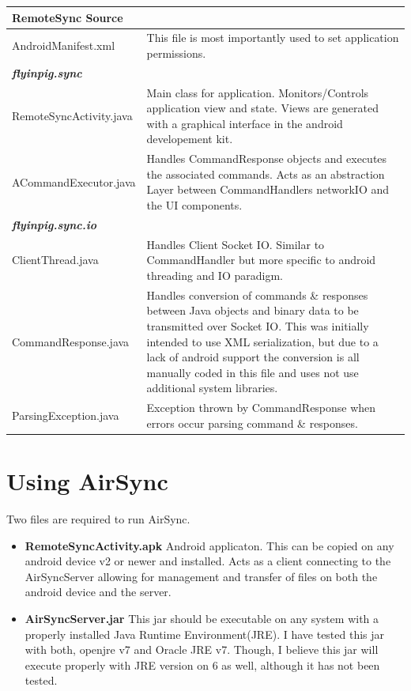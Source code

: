 \documentclass[12pt]{article}
\begin{document}
\begin{center}
\begin{tabular}{|l|p{7.5cm}|}
\hline
	\textbf{RemoteSync Source} \\
\hline 
	AndroidManifest.xml
	& This file is most importantly used to set application permissions.\\
\hline
	\emph{\textbf{flyinpig.sync}}\\
\hline
	RemoteSyncActivity.java
	& Main class for application. Monitors/Controls application view and state. Views are generated with a graphical interface in the android developement kit.\\
\hline
	ACommandExecutor.java
	& Handles CommandResponse objects and executes the associated commands. Acts as an abstraction Layer between CommandHandlers networkIO and the UI components. \\
\hline
	\emph{\textbf{flyinpig.sync.io}}\\
\hline
	ClientThread.java
	& Handles Client Socket IO. Similar to CommandHandler but more specific to android threading and IO paradigm.\\
\hline
	CommandResponse.java
	& Handles conversion of commands \& responses between Java objects and binary data to be transmitted over Socket IO. This was initially intended to use XML serialization, but due to a lack of android support the conversion is all manually coded in this file and uses not use additional system libraries.\\
\hline
	ParsingException.java
	& Exception thrown by CommandResponse when errors occur parsing command \& responses.\\
\hline
\end{tabular}
\end{center}

\section{Using AirSync}

Two files are required to run AirSync. 
\begin{itemize}
\item \textbf{RemoteSyncActivity.apk} Android applicaton. This can be copied on any android device v2 or newer and installed. Acts as a client connecting to the AirSyncServer allowing for management and transfer of files on both the android device and the server.
\item \textbf{AirSyncServer.jar} This jar should be executable on any system with a properly installed Java Runtime Environment(JRE). I have tested this jar with both, openjre v7 and Oracle JRE v7. Though, I believe this jar will execute properly with JRE version on 6 as well, although it has not been tested.
\end{itemize}
\end{document}

